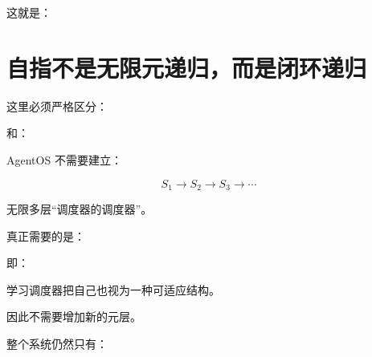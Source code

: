 \begin{statementbox}
\centering
{}
\end{statementbox}

这就是：

\begin{statementbox}
\centering
{}
\end{statementbox}


\section{自指不是无限元递归，而是闭环递归}

这里必须严格区分：

\begin{statementbox}
\centering
{}
\end{statementbox}

和：

\begin{statementbox}
\centering
{}
\end{statementbox}

AgentOS 不需要建立：

\[
S_1
\rightarrow
S_2
\rightarrow
S_3
\rightarrow\cdots
\]

无限多层“调度器的调度器”。

真正需要的是：

\begin{statementbox}
\centering
{}
\end{statementbox}

即：

\begin{statementbox}
\centering
{}
\end{statementbox}

学习调度器把自己也视为一种可适应结构。

因此不需要增加新的元层。

整个系统仍然只有：

\begin{statementbox}
\centering
{}
\end{statementbox}

